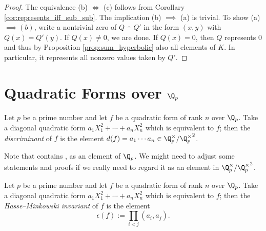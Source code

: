 \begin{proof}
The equivalence (b) $\iff$ (c) follows from Corollary \ref{cor:represents_iff_sub_sub}. The implication (b) $\implies$ (a) is trivial. To show (a) $\implies (b)$, write a nontrivial zero of $Q \dotminus Q'$ in the form $(x, y)$ with $Q(x) = Q'(y)$. If $Q(x) \ne 0$, we are done. If $Q(x) = 0$, then $Q$ represents $0$ and thus by Proposition \ref{prop:sum_hyperbolic} also all elements of $K$. In particular, it represents all nonzero values taken by $Q'$.
\end{proof}

\section[Quadratic Forms over the p-adics]{Quadratic Forms over $\Q_p$}\label{sec:quadratic_form_padic}

\begin{definition}\label{def:discr}
\mathlibok
{}
Let $p$ be a prime number and let $f$ be a quadratic form of rank $n$ over $\Q_p$. Take a diagonal quadratic form $a_1X_1^2 + \cdots + a_nX_n^2$ which is equivalent to $f$; then the \emph{discriminant} of $f$ is the element $d(f) = a_1 \cdots a_n \in \Q_p^\times/{\Q_p^\times}^2$.

Note that \mathlib contains , as an element of $\Q_p$. We might need to adjust some statements and proofs if we really need to regard it as an element in $\Q_p^\times/{\Q_p^\times}^2$.
\end{definition}

\begin{definition}\label{def:HM_inv}
\leanok
Let $p$ be a prime number and let $f$ be a quadratic form of rank $n$ over $\Q_p$. Take a diagonal quadratic form $a_1X_1^2 + \cdots + a_nX_n^2$ which is equivalent to $f$; then the \emph{Hasse--Minkowski invariant} of $f$ is the element
\[ \epsilon(f) := \prod_{i < j}(a_i, a_j).\]
\end{definition}

